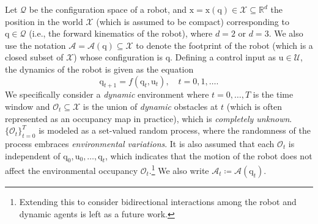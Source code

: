 \documentclass[lettersize,journal]{IEEEtran}
\begin{document}
Let $\mathcal{Q}$ be the configuration space of a robot, and  $\mathrm{x} = \mathrm{x}(\mathrm{q}) \in \mathcal{X} \subseteq \mathbb{R}^d$ the position in the world $\mathcal{X}$ (which is assumed to be compact) corresponding to $\mathrm{q}\in \mathcal{Q}$ (i.e., the forward kinematics of the robot), where $d = 2$ or $d=3$.
We also use the notation $\mathcal{A} = \mathcal{A}(\mathrm{q}) \subseteq \mathcal{X}$ to denote the footprint of the robot (which is a closed subset of $\mathcal{X}$) whose configuration is $\mathrm{q}$. Defining a control input as $\mathrm{u} \in \mathcal{U}$, the dynamics of the robot is given as the equation
\begin{equation*}
\mathrm{q}_{t+1} = f(\mathrm{q}_{t}, \mathrm{u}_{t}), \quad t = 0, 1, \ldots.
\end{equation*}
We specifically consider a \emph{dynamic} environment where $t =0, \ldots, T$ is the time window and $\mathcal{O}_t \subseteq \mathcal{X}$ is the union of \emph{dynamic} obstacles at $t$ (which is often represented as an occupancy map in practice), which is \emph{completely unknown}. $\{ \mathcal{O}_t\}_{t = 0}^T$ is modeled as a set-valued random process, where the randomness of the process embraces \emph{environmental variations}. It is also assumed that each $\mathcal{O}_t$ is independent of $\mathrm{q}_0, \mathrm{u}_0, \ldots, \mathrm{q}_t$, which indicates that the motion of the robot does not affect the environmental occupancy $\mathcal{O}_t$.\footnote{Extending this to consider bidirectional interactions among the robot and dynamic agents is left as a future work.} We also write $\mathcal{A}_t \coloneqq \mathcal{A}(\mathrm{q}_t)$.
\end{document}
